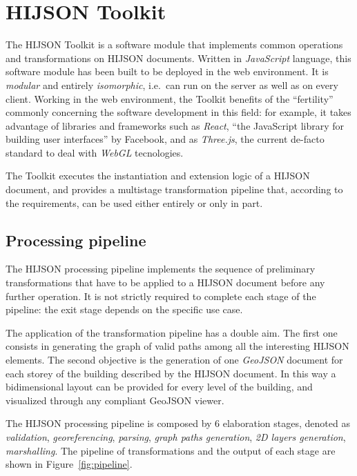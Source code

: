 
\section{HIJSON Toolkit}\label{hijson-toolkit}

The HIJSON Toolkit is a software module that implements common
operations and transformations on HIJSON documents. Written in
\emph{JavaScript} language, this software module has been built to be deployed in the web
environment. It is \emph{modular} and entirely \emph{isomorphic},
i.e.~can run on the server as well as on every client. Working in the
web environment, the Toolkit benefits of the ``fertility'' commonly concerning the
software development in this field: for example, it takes advantage of libraries and
frameworks such as \emph{React}, ``the JavaScript library for building
user interfaces'' by Facebook, and as \emph{Three.js}, the current de-facto standard to deal
with \emph{WebGL} tecnologies.

The Toolkit executes the instantiation and extension logic of a HIJSON
document, and provides a multistage transformation pipeline that, according to the requirements,
can be used either entirely or only in part.

\subsection{Processing pipeline}\label{hijson-processing-pipeline}

The HIJSON processing pipeline implements the sequence of preliminary
transformations that have to be applied to a HIJSON document before any
further operation. It is not strictly required to complete each stage of
the pipeline: the exit stage depends on the specific use case.

The application of the transformation pipeline has a double aim. The first one
consists in generating the graph of valid paths among all the interesting
HIJSON elements. The second objective is the generation of one \emph{GeoJSON}
document for each storey of the building described by the HIJSON document. In
this way a bidimensional layout  can be provided for every level of the building, 
and visualized through any compliant GeoJSON viewer.

The HIJSON processing pipeline is composed by 6 elaboration stages, denoted as \emph{validation}, \emph{georeferencing}, \emph{parsing}, \emph{graph
paths generation}, \emph{2D layers generation}, \emph{marshalling}. The pipeline of transformations and the output of each stage are shown in Figure~\ref{fig:pipeline}.

